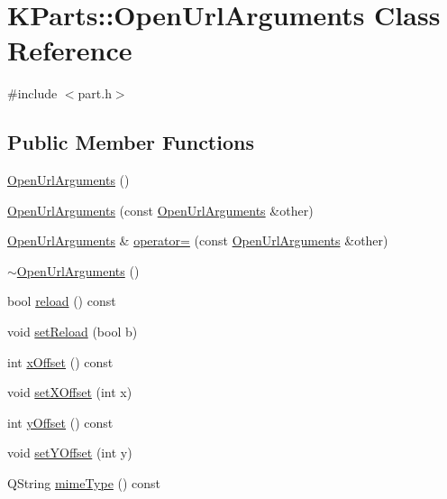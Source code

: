 \hypertarget{classKParts_1_1OpenUrlArguments}{\section{K\+Parts\+:\+:Open\+Url\+Arguments Class Reference}
\label{classKParts_1_1OpenUrlArguments}
}


{\ttfamily \#include $<$part.\+h$>$}

\subsection*{Public Member Functions}
\begin{DoxyCompactItemize}
\item 
\hyperlink{classKParts_1_1OpenUrlArguments_af4c1ee81217691a1dc9c7db9ba7d59f8}{Open\+Url\+Arguments} ()
\item 
\hyperlink{classKParts_1_1OpenUrlArguments_ac6d97bc2c3d8f926bd163b3a35bd5809}{Open\+Url\+Arguments} (const \hyperlink{classKParts_1_1OpenUrlArguments}{Open\+Url\+Arguments} \&other)
\item 
\hyperlink{classKParts_1_1OpenUrlArguments}{Open\+Url\+Arguments} \& \hyperlink{classKParts_1_1OpenUrlArguments_a17e55b23d031666e50cc96aae65233f3}{operator=} (const \hyperlink{classKParts_1_1OpenUrlArguments}{Open\+Url\+Arguments} \&other)
\item 
\hyperlink{classKParts_1_1OpenUrlArguments_a667623f26093523412bd9060b423971d}{$\sim$\+Open\+Url\+Arguments} ()
\item 
bool \hyperlink{classKParts_1_1OpenUrlArguments_a75c903644fed82bc1982cededcb1c05a}{reload} () const 
\item 
void \hyperlink{classKParts_1_1OpenUrlArguments_a2b9d7ac959db074ef06697de8f4e7a14}{set\+Reload} (bool b)
\item 
int \hyperlink{classKParts_1_1OpenUrlArguments_a3eb562ffb04cc93b0a5aa0e385058aa3}{x\+Offset} () const 
\item 
void \hyperlink{classKParts_1_1OpenUrlArguments_a2429db3ff60f2cca3aac4d3e9c7cde7b}{set\+X\+Offset} (int x)
\item 
int \hyperlink{classKParts_1_1OpenUrlArguments_a29dbdad63be6e6904d5fd2c9fd9cd38b}{y\+Offset} () const 
\item 
void \hyperlink{classKParts_1_1OpenUrlArguments_a19d0a9e25a2bbe4cd0d7c255bfa8441c}{set\+Y\+Offset} (int y)
\item 
Q\+String \hyperlink{classKParts_1_1OpenUrlArguments_aaddc679e216a0ce1a20983c0134675c5}{mime\+Type} () const 

\end{DoxyCompactItemize}
